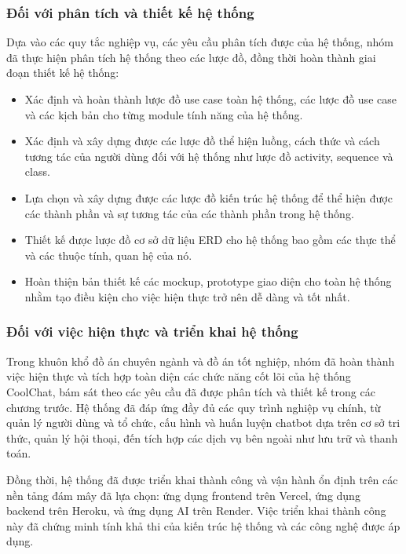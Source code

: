 \subsubsection{Đối với phân tích và thiết kế hệ thống}
Dựa vào các quy tắc nghiệp vụ, các yêu cầu phân tích được của hệ thống, nhóm đã thực hiện phân tích hệ thống theo các lược đồ, đồng thời hoàn thành giai đoạn thiết kế hệ thống:
\begin{itemize}
    \item Xác định và hoàn thành lược đồ use case toàn hệ thống, các lược đồ use case và các kịch bản cho từng module tính năng của hệ thống.
    \item Xác định và xây dựng được các lược đồ thể hiện luồng, cách thức và cách tương tác của người dùng
    đối với hệ thống như lược đồ activity, sequence và class.
    \item Lựa chọn và xây dựng được các lược đồ kiến trúc hệ thống để thể hiện được các thành
    phần và sự tương tác của các thành phần trong hệ thống.
    \item Thiết kế được lược đồ cơ sở dữ liệu ERD cho hệ thống bao gồm các thực thể và các thuộc tính, quan hệ của nó.
    \item Hoàn thiện bản thiết kế các mockup, prototype giao diện cho toàn hệ thống nhằm tạo điều kiện cho việc hiện thực trở nên dễ dàng và tốt nhất.
\end{itemize}

\subsubsection{Đối với việc hiện thực và triển khai hệ thống}
Trong khuôn khổ đồ án chuyên ngành và đồ án tốt nghiệp, nhóm đã hoàn thành việc hiện thực và tích hợp toàn diện các chức năng cốt lõi của hệ thống CoolChat, bám sát theo các yêu cầu đã được phân tích và thiết kế trong các chương trước. Hệ thống đã đáp ứng đầy đủ các quy trình nghiệp vụ chính, từ quản lý người dùng và tổ chức, cấu hình và huấn luyện chatbot dựa trên cơ sở tri thức, quản lý hội thoại, đến tích hợp các dịch vụ bên ngoài như lưu trữ và thanh toán.

Đồng thời, hệ thống đã được triển khai thành công và vận hành ổn định trên các nền tảng đám mây đã lựa chọn: ứng dụng frontend trên Vercel, ứng dụng backend trên Heroku, và ứng dụng AI trên Render. Việc triển khai thành công này đã chứng minh tính khả thi của kiến trúc hệ thống và các công nghệ được áp dụng.

